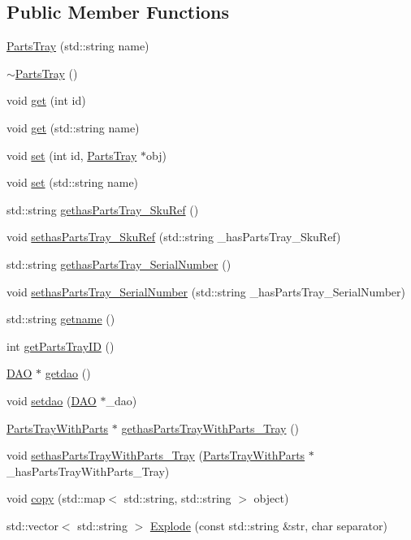 \subsection*{Public Member Functions}
\begin{DoxyCompactItemize}
\item 
\hyperlink{class_parts_tray_a87cd78c732f56c2e31c7e5d846070df2}{PartsTray} (std::string name)
\item 
\hyperlink{class_parts_tray_ae3f422590eeb12861cd3fa9ec6c20185}{$\sim$PartsTray} ()
\item 
void \hyperlink{class_parts_tray_a557e7cfd7075b70f8019866363984ac9}{get} (int id)
\item 
void \hyperlink{class_parts_tray_a6e725e36cbe03d114ff4c1bad5acda98}{get} (std::string name)
\item 
void \hyperlink{class_parts_tray_ab138d728514cbfcd250e20638f885d4b}{set} (int id, \hyperlink{class_parts_tray}{PartsTray} $\ast$obj)
\item 
void \hyperlink{class_parts_tray_a7496bd4db3ab8833f782b48e5596b576}{set} (std::string name)
\item 
std::string \hyperlink{class_parts_tray_a45e7fd7d80f73ddebaf83414cc4730ba}{gethasPartsTray\_\-SkuRef} ()
\item 
void \hyperlink{class_parts_tray_a7e41572983ea4493948e3ae044b66204}{sethasPartsTray\_\-SkuRef} (std::string \_\-hasPartsTray\_\-SkuRef)
\item 
std::string \hyperlink{class_parts_tray_a48c11f7a534d476e10217c9e5e03243e}{gethasPartsTray\_\-SerialNumber} ()
\item 
void \hyperlink{class_parts_tray_a9190363373248d4773820fd410cdda34}{sethasPartsTray\_\-SerialNumber} (std::string \_\-hasPartsTray\_\-SerialNumber)
\item 
std::string \hyperlink{class_parts_tray_a73f4b19e484bb5cbaf170b5060056037}{getname} ()
\item 
int \hyperlink{class_parts_tray_a57bba96b2231a5070302d927f727284d}{getPartsTrayID} ()
\item 
\hyperlink{class_d_a_o}{DAO} $\ast$ \hyperlink{class_parts_tray_a8e20e7020af9d92969bbf7709773f43f}{getdao} ()
\item 
void \hyperlink{class_parts_tray_aed8711bfa469b61029ea4f9db477f60b}{setdao} (\hyperlink{class_d_a_o}{DAO} $\ast$\_\-dao)
\item 
\hyperlink{class_parts_tray_with_parts}{PartsTrayWithParts} $\ast$ \hyperlink{class_parts_tray_ac3f7a50d8362987af0a22ed7368a520a}{gethasPartsTrayWithParts\_\-Tray} ()
\item 
void \hyperlink{class_parts_tray_af06755e9b74aa8cf0da8866d7b6ccaef}{sethasPartsTrayWithParts\_\-Tray} (\hyperlink{class_parts_tray_with_parts}{PartsTrayWithParts} $\ast$\_\-hasPartsTrayWithParts\_\-Tray)
\item 
void \hyperlink{class_parts_tray_a04a7bd17fc8b13de088bd359f3e3dbd8}{copy} (std::map$<$ std::string, std::string $>$ object)
\item 
std::vector$<$ std::string $>$ \hyperlink{class_parts_tray_a54af8fcf50c0f2ad0c45328999eaa668}{Explode} (const std::string \&str, char separator)
\end{DoxyCompactItemize}


